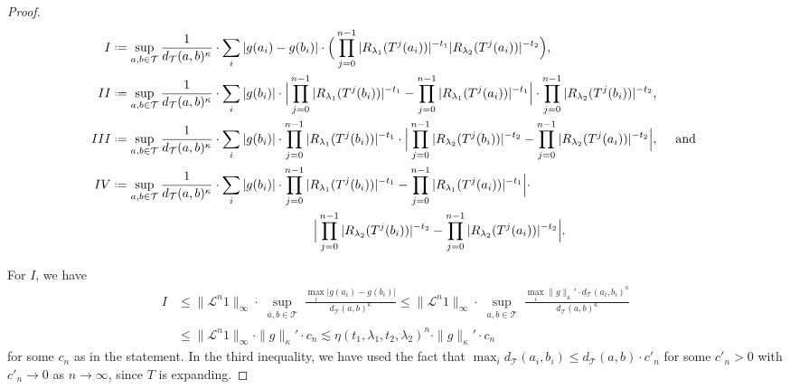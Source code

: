 \documentclass[11pt]{amsart}
\theoremstyle{plain}
\theoremstyle{definition}
\theoremstyle{remark}
\newcommand*{\defeq}{\mathrel{\vcenter{\baselineskip0.5ex \lineskiplimit0pt
			\hbox{\scriptsize.}\hbox{\scriptsize.}}}%
	=}
\begin{document}
\begin{proof}
\begin{align*}
I & \defeq \sup_{\substack{a,b\in \mathcal T}}
\frac{1}{d_{\mathcal{T}}(a,b)^{\kappa}} \cdot \sum_{i} |g(a_i)-g(b_i)|
\cdot
\Big(
\prod_{j=0}^{n-1}
|R_{\lambda_1}(T^{j}(a_i))|^{-t_1}
|R_{\lambda_2}(T^{j}(a_i))|^{-t_2}
\Big),\\
II & \defeq
\sup_{\substack{a,b\in \mathcal T}}
\frac{1}{d_{\mathcal{T}}(a,b)^{\kappa}} \cdot \sum_{i}|g(b_i)|\cdot  \Big|
\prod_{j=0}^{n-1}
|R_{\lambda_1}(T^{j}(b_i))|^{-t_1}
-
\prod_{j=0}^{n-1}
|R_{\lambda_1}(T^{j}(a_i))|^{-t_1}
\Big|
\cdot
\prod_{j=0}^{n-1}
|R_{\lambda_2}(T^{j}(b_i))|^{-t_2},
\\
III & \defeq
\sup_{\substack{a,b\in \mathcal T}}
\frac{1}{d_{\mathcal{T}}(a,b)^{\kappa}} \cdot \sum_{i}|g(b_i)|\cdot 
\prod_{j=0}^{n-1}
|R_{\lambda_1}(T^{j}(b_i))|^{-t_1}
\cdot
\Big|
\prod_{j=0}^{n-1}
|R_{\lambda_2}(T^{j}(b_i))|^{-t_2}
-
\prod_{j=0}^{n-1}
|R_{\lambda_2}(T^{j}(a_i))|^{-t_2}
\Big|,\quad \mbox{ and }\\
IV & \defeq
\sup_{\substack{a,b\in \mathcal T}}
\frac{1}{d_{\mathcal{T}}(a,b)^{\kappa}} \cdot \sum_{i}|g(b_i)|\cdot 
\prod_{j=0}^{n-1}
|R_{\lambda_1}(T^{j}(b_i))|^{-t_1}
-
\prod_{j=0}^{n-1}
|R_{\lambda_1}(T^{j}(a_i))|^{-t_1}
\Big|
\cdot\\
& \quad \quad
\quad \quad
\quad \quad
\quad \quad
\quad \quad
\quad \quad
\quad \quad
\quad \quad  \Big|
\prod_{j=0}^{n-1}
|R_{\lambda_2}(T^{j}(b_i))|^{-t_2}
-
\prod_{j=0}^{n-1}
|R_{\lambda_2}(T^{j}(a_i))|^{-t_2}
\Big|.
\end{align*}

For $I$, we have
\begin{align*}
I &
\le \|\mathcal{L}
^n 1\|_\infty \cdot \sup_{\substack{a,b\in \mathcal T}}
\frac{\max_{i} |g(a_i)-g(b_i)|}{d_{\mathcal{T}}(a,b)^{\kappa}}
\le \|\mathcal{L}
^n 1\|_\infty \cdot \sup_{\substack{a,b\in \mathcal T}}
\frac{\max_i \|g\|_{\kappa}' \cdot d_{\mathcal{T}}(a_i,b_i)^\kappa}{d_{\mathcal{T}}(a,b)^{\kappa}}  \\
& \le
\|\mathcal{L}
^n 1\|_\infty \cdot \|g\|_{\kappa}'\cdot c_n\lesssim
\eta(t_1,\lambda_1, t_2, \lambda_2)^n
\cdot\|g\|_{\kappa}'\cdot  c_n
\end{align*}
for some $c_n$ as in the statement.
In the third inequality, we have used the fact that $\max_i d_\mathcal{T}(a_i,b_i) \le d_{\mathcal{T}}(a,b)\cdot c'_n$ for some $c'_n>0$ 
with $c'_n \to 0$ as $n \to \infty$,
since $T$ is expanding.

\medskip


\end{proof}
\end{document}
